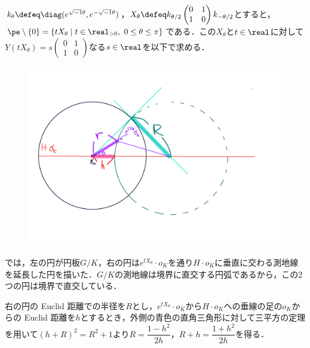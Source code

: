 \begin{npfwn}


  $k_{\theta} \defeq \diag(e^{\sqrt{-1}\theta},e^{-\sqrt{-1}\theta}) $，$X_{\theta} \defeq k_{\theta/2}
  \begin{pmatrix}
    0 & 1 \\ 1 & 0
  \end{pmatrix}
  k_{-\theta/2}$とすると，$\pe\setminus\{0\} =  \{tX_{\theta}\mid t\in \real_{>0},\ 0\leq \theta\leq \pi\}$である．この$X_{\theta} $と$t\in \real$に対して$Y(tX_{\theta} ) = s
  \begin{pmatrix}
    0 & 1 \\ 1 & 0
  \end{pmatrix}
  $なる$s\in \real $を以下で求める．


  
  \begin{figure}[H]
    \centering
    \includegraphics[scale=0.35]{../graph/prob-eg-2.pdf}
    \caption{}
    \label{fig:prob-eg-1}
  \end{figure}

  では，左の円が{\Poincare}円板$G/K$，右の円は$e^{tX_{\theta}}\cdot o_K $を通り$H\cdot o_K$に垂直に交わる測地線を延長した円を描いた．$G/K$の測地線は境界に直交する円弧であるから，この2つの円は境界で直交している．

  右の円の Euclid 距離での半径を$R$とし，$e^{tX_{\theta}}\cdot o_K $から$H\cdot o_K$への垂線の足の$o_K$からの Euclid 距離を$h$とするとき，外側の青色の直角三角形に対して三平方の定理を用いて$(h+R)^2 = R^2 +  1 $より$R = \dfrac{1-h^2}{2h}$，$R+h = \dfrac{1+h^2}{2h}  $を得る．


\end{npfwn}
